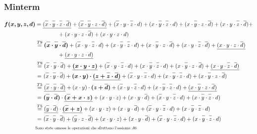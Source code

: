 \documentclass{article}
\newcommand*{\oline}[1]{\overline{#1\mathstrut}}
\newcommand{\bigspace}{\quad\quad\quad\quad}
\begin{document}
\subsubsection*{Minterm}
\bigspace
\begin{align*}
\bm{f(x,y,z,d)} &= \underline{(\oline{x} \cdot \oline{y} \cdot \oline{z} \cdot \oline{d})} +  \underline{(\oline{x} \cdot \oline{y} \cdot z \cdot \oline{d})} + (\oline{x} \cdot y \cdot \oline{z} \cdot d) + (x \cdot \oline{y} \cdot \oline{z} \cdot d) + (x \cdot \oline{y} \cdot z \cdot \oline{d}) + (x \cdot y \cdot \oline{z} \cdot \oline{d}) + \\
&\bigspace + (x \cdot y \cdot z \cdot \oline{d}) + (x \cdot y \cdot z \cdot d)\\
&\overset{T9}{=} \bm{(\oline{x} \cdot \oline{y} \cdot \oline{d})} + (\oline{x} \cdot y \cdot \oline{z} \cdot d) +(x \cdot \oline{y} \cdot \oline{z} \cdot d) + (x \cdot \oline{y} \cdot z \cdot \oline{d}) + (x \cdot y \cdot \oline{z} \cdot  \oline{d}) + \underline{(x \cdot y \cdot z \cdot \oline{d})}\\
&\bigspace + \underline{(x \cdot y \cdot z \cdot d)}\\
&\overset{T9}{=} (\oline{x} \cdot \oline{y} \cdot \oline{d}) + \bm{\underline{(x \cdot y \cdot z )}} + (\oline{x} \cdot y \cdot \oline{z} \cdot d) + (x \cdot \oline{y} \cdot \oline{z} \cdot d) + (x \cdot \oline{y} \cdot z \cdot \oline{d}) + \underline{(x \cdot y \cdot \oline{z} \cdot \oline{d})} \\
&\ {=} \  (\oline{x} \cdot \oline{y} \cdot \oline{d}) + \bm{(x \cdot y)} \bm\cdot \bm{\underline{(z + \oline{z} \cdot \oline{d})}} + (\oline{x} \cdot y \cdot \oline{z} \cdot d) + (x \cdot \oline{y} \cdot \oline{z} \cdot d) +  (x \cdot \oline{y} \cdot z \cdot \oline{d})\\
&\overset{T5}{=}  \underline{(\oline{x} \cdot \oline{y} \cdot \oline{d})} + {(x \cdot y)} \cdot \bm{(z +  \oline{d})} + (\oline{x} \cdot y \cdot \oline{z} \cdot d) + (x \cdot \oline{y} \cdot \oline{z} \cdot d) +  \underline{(x \cdot \oline{y} \cdot z \cdot \oline{d})}\\
&\ {=} \ \bm{{(\oline{y} \cdot \oline{d})}} \cdot \bm{\underline{(\oline{x} +  x \cdot z)}} +(x \cdot y \cdot z) + (x \cdot y \cdot \oline{d}) + (\oline{x} \cdot y \cdot \oline{z} \cdot d) + (x \cdot \oline{y} \cdot \oline{z} \cdot d)\\
&\overset{T5}{=} \underline{{(\oline{y} \cdot \oline{d})}} \cdot \bm{\underline{(\oline{x} +  z)} } + (x \cdot y \cdot z) + (x \cdot y \cdot \oline{d}) + (\oline{x} \cdot y \cdot \oline{z} \cdot d) + (x \cdot \oline{y} \cdot \oline{z} \cdot d) \\
&\ {=} \ (\oline{x} \cdot \oline{y} \cdot \oline{d}) +(\oline{y} \cdot z \cdot \oline{d})+ (x \cdot y \cdot z) + (x \cdot y \cdot \oline{d}) + (\oline{x} \cdot y \cdot \oline{z} \cdot d) + (x \cdot \oline{y} \cdot \oline{z} \cdot d) \\
&\scalebox{0.7}{Sono state omesse le operazioni che sfruttano l'assioma $A6$}\
\end{align*}
\end{document}

